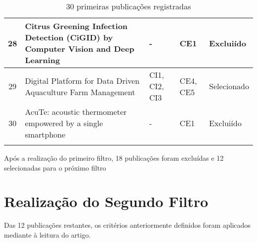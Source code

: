 \documentclass[12pt]{article}
\begin{document}
\begin{footnotesize}
\begin{longtable}{|c|p{7cm}|p{2cm}|p{2cm}|p{1.6cm}|}
		28 & Citrus Greening Infection Detection (CiGID) by Computer Vision and Deep Learning & - & CE1 & Excluiído \\ \hline
		29 & Digital Platform for Data Driven Aquaculture Farm Management & CI1, CI2, CI3 & CE4, CE5 & Selecionado \\ \hline
		30 & AcuTe: acoustic thermometer empowered by a single smartphone & - & CE1 & Excluiído \\ \hline
			\caption{30 primeiras publicações registradas} \label{tab:filtro1} \\
		\end{longtable}
	\end{footnotesize}

Após a realização do primeiro filtro, 18 publicações foram excluídas e 12 selecionadas para o próximo filtro

\section{Realização do Segundo Filtro}

Das 12 publicações restantes, os critérios anteriormente definidos foram aplicados mediante à leitura do artigo.
\end{document}
